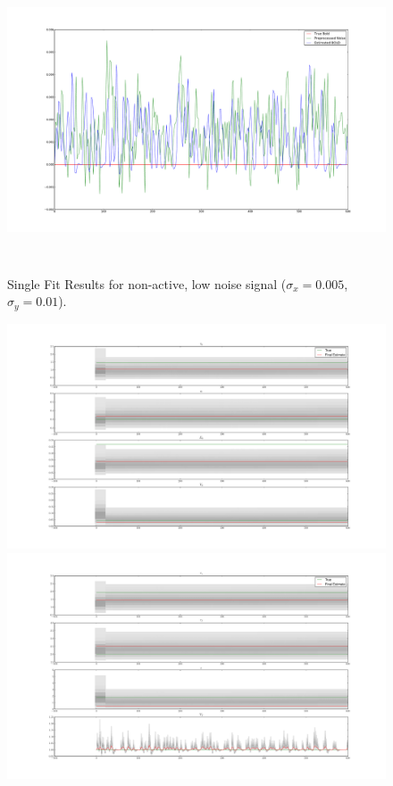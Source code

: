 \begin{figure}[H]
\centering
\includegraphics[clip=true,trim=6cm 3cm 6cm 3cm,height=9cm]{images/justnoise_fit_0}
\caption[Single Fit Results for non-active, low noise signal.]
{Single Fit Results for non-active, low noise signal
 ($\sigma_x = 0.005$, $\sigma_y = 0.01$).}
\label{fig:justnoise_fit_0}
\end{figure} %

\begin{figure}[H]
\centering
\subfigure
{\includegraphics[clip=true,trim=7cm 3cm 6cm 3cm, width=\textwidth]{images/justnoise_hist_1}}
\subfigure
{\includegraphics[clip=true,trim=7cm 3cm 6cm 3cm, width=\textwidth]{images/justnoise_hist_2}}
\end{figure}

